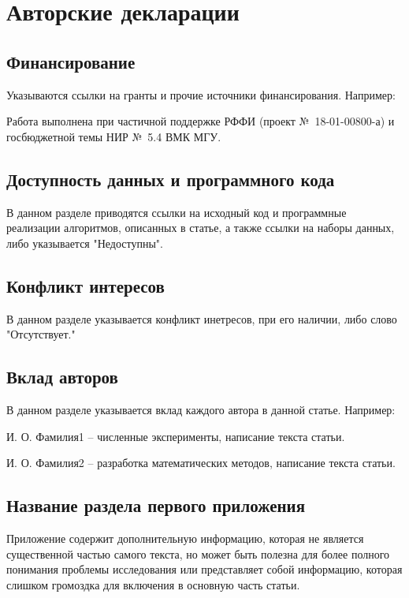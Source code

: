 \documentclass[pdflatex,sn-mathphys-gost]{pmi-jnl}
\begin{document}
\backmatter



\section*{Авторские декларации}

\subsection*{Финансирование}

Указываются ссылки на гранты и прочие источники финансирования.
Например:

Работа выполнена при частичной поддержке РФФИ
(проект \hbox{№~18-01-00800-а}) и госбюджетной темы НИР №~5.4 ВМК МГУ.

\subsection*{Доступность данных и программного кода}

В данном разделе приводятся ссылки на исходный код и программные реализации алгоритмов, описанных в статье, а также ссылки на наборы данных, либо указывается "Недоступны".

\subsection*{Конфликт интересов}

В данном разделе указывается конфликт инетресов, при его наличии, либо слово "Отсутствует."

\subsection*{Вклад авторов}

В данном разделе указывается вклад каждого автора в данной статье. Например:

И. О. Фамилия1 -- численные эксперименты, написание текста статьи.

И. О. Фамилия2 -- разработка математических методов, написание текста статьи.

\begin{appendices}

\section{Название раздела первого приложения}\label{secA1}

Приложение содержит дополнительную информацию, которая не является существенной частью самого текста, но может быть полезна для более полного понимания проблемы исследования или представляет собой информацию, которая слишком громоздка для включения в основную часть статьи.


\end{appendices}


\end{document}
